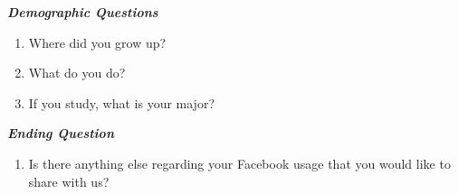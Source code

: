 \textbf{\textit{Demographic Questions}}
\begin{enumerate}
\item Where did you grow up?
\item What do you do?
\item If you study, what is your major?
\end{enumerate}
\textbf{\textit{Ending Question}}
\begin{enumerate}
\item Is there anything else regarding your Facebook usage that you would like to share with us?
\end{enumerate}
%